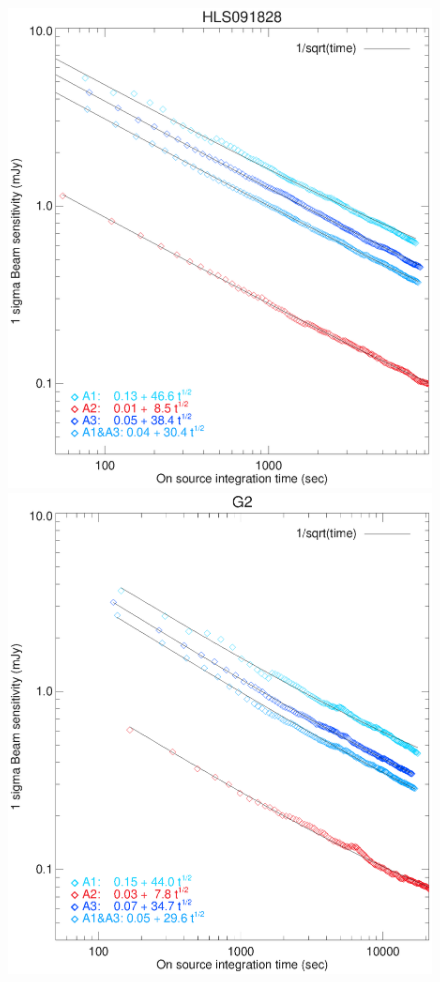 \begin{figure}[!thbp]
\begin{center}
\includegraphics[clip, angle=0, scale =0.42]{Figures/hls_nefd_vst.eps}
\includegraphics[clip, angle=0, scale =0.42]{Figures/g2_nefd_vst.eps}

\end{center}
\end{figure}
